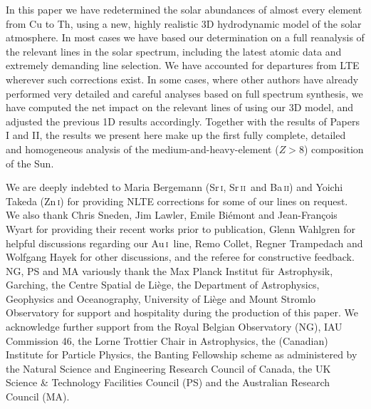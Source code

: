 \documentclass[traditabstract]{aa}
\newcommand{\altzni}{Zn\,\textsc{i}}
\newcommand{\altsri}{Sr\,\textsc{i}}
\newcommand{\altsrii}{Sr\,\textsc{ii}}
\newcommand{\altbaii}{Ba\,\textsc{ii}}
\newcommand{\altaui}{Au\,\textsc{i}}
\newcommand{\srii}{\altsrii\ }
\newcommand{\aui}{\altaui\ }
\begin{document}
In this paper we have redetermined the solar abundances of almost every element from Cu to Th, using a new, highly realistic 3D hydrodynamic model of the solar atmosphere.  In most cases we have based our determination on a full reanalysis of the relevant lines in the solar spectrum, including the latest atomic data and extremely demanding line selection.  We have accounted for departures from LTE wherever such corrections exist. In some cases, where other authors have already performed very detailed and careful analyses based on full spectrum synthesis, we have computed the net impact on the relevant lines of using our 3D model, and adjusted the previous 1D results accordingly.  Together with the results of Papers I and II, the results we present here make up the first fully complete, detailed and homogeneous analysis of the medium-and-heavy-element ($Z>8$) composition of the Sun.


\begin{acknowledgements}
We are deeply indebted to Maria Bergemann (\altsri, \srii and \altbaii) and Yoichi Takeda (\altzni) for providing NLTE corrections for some of our lines on request.  We also thank Chris Sneden, Jim Lawler, Emile Bi\'emont and Jean-Fran\c{c}ois Wyart for providing their recent works prior to publication, Glenn Wahlgren for helpful discussions regarding our \aui line, Remo Collet, Regner Trampedach and Wolfgang Hayek for other discussions, and the referee for constructive feedback.  NG, PS and MA variously thank the Max Planck Institut f\"ur Astrophysik, Garching, the Centre Spatial de Li\`ege, the Department of Astrophysics, Geophysics and Oceanography, University of Li\`ege and Mount Stromlo Observatory for support and hospitality during the production of this paper.  We acknowledge further support from the Royal Belgian Observatory (NG), IAU Commission 46, the Lorne Trottier Chair in Astrophysics, the (Canadian) Institute for Particle Physics, the Banting Fellowship scheme as administered by the Natural Science and Engineering Research Council of Canada, the UK Science \& Technology Facilities Council (PS) and the Australian Research Council (MA).
\end{acknowledgements}
\end{document}
